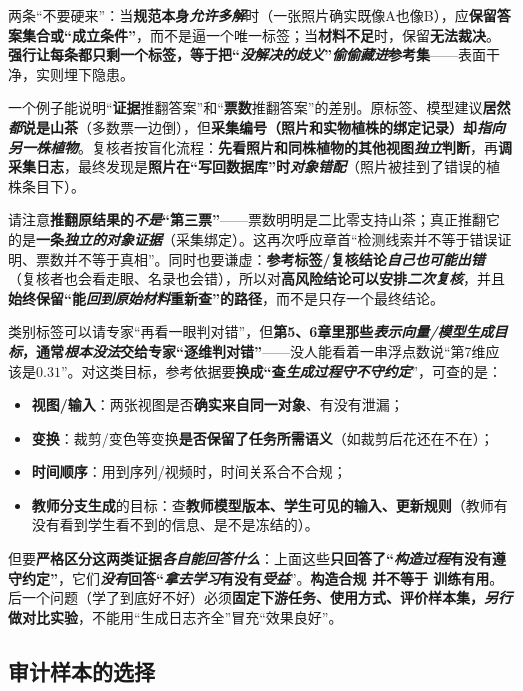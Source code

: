 两条“不要硬来”：当\textbf{规范本身\emph{允许多解}}时（一张照片确实既像A也像B），应\textbf{保留答案集合或“成立条件”}，而不是逼一个唯一标签；当\textbf{材料不足}时，保留\textbf{无法裁决}。\textbf{强行让每条都只剩一个标签，等于把“\emph{没解决的歧义}”\emph{偷偷藏进}参考集}——表面干净，实则埋下隐患。

一个例子能说明“\textbf{证据}推翻答案”和“\textbf{票数}推翻答案”的差别。原标签、模型建议\textbf{居然\emph{都}说是山茶}（多数票一边倒），但\textbf{采集编号（照片和实物植株的绑定记录）却\emph{指向另一株植物}}。复核者按盲化流程：\textbf{先看照片和同株植物的其他视图\emph{独立}判断}，再\textbf{调采集日志}，最终发现是\textbf{照片在“写回数据库”时\emph{对象错配}}（照片被挂到了错误的植株条目下）。

请注意\textbf{推翻原结果的\emph{不是}“第三票”}——票数明明是二比零支持山茶；真正推翻它的是\textbf{一条\emph{独立的对象证据}}（采集绑定）。这再次呼应章首“检测线索并不等于错误证明、票数并不等于真相”。同时也要谦虚：\textbf{参考标签/复核结论\emph{自己也可能出错}}（复核者也会看走眼、名录也会错），所以对\textbf{高风险结论可以安排\emph{二次复核}}，并且\textbf{始终保留“能\emph{回到原始材料}重新查”的路径}，而不是只存一个最终结论。

类别标签可以请专家“再看一眼判对错”，但\textbf{第5、6章里那些\emph{表示向量/模型生成目标}，通常\textbf{\emph{根本没法}交给专家“逐维判对错”}}——没人能看着一串浮点数说“第7维应该是$0.31$”。对这类目标，参考依据要\textbf{换成“查\emph{生成过程守不守约定}}”，可查的是：
\begin{itemize}\item \textbf{视图/输入}：两张视图是否\textbf{确实来自同一对象}、有没有泄漏；\item \textbf{变换}：裁剪/变色等变换\textbf{是否保留了任务所需语义}（如裁剪后花还在不在）；\item \textbf{时间顺序}：用到序列/视频时，时间关系合不合规；\item \textbf{教师分支生成}的目标：查\textbf{教师模型版本、学生可见的输入、更新规则}（教师有没有看到学生看不到的信息、是不是冻结的）。\end{itemize}
但要\textbf{严格区分这两类证据\emph{各自能回答什么}}：上面这些\textbf{只回答了“\emph{构造过程}有没有遵守约定”}，它们\textbf{\emph{没有}回答“\emph{拿去学习}有没有\emph{受益}}”。\textbf{构造合规 并不等于 训练有用}。后一个问题（学了到底好不好）必须\textbf{固定下游任务、使用方式、评价样本集，\emph{另行}做对比实验}，不能用“生成日志齐全”冒充“效果良好”。

\subsection{审计样本的选择}
\label{sec:knowledge-quality-assessment-correction-sampling}

